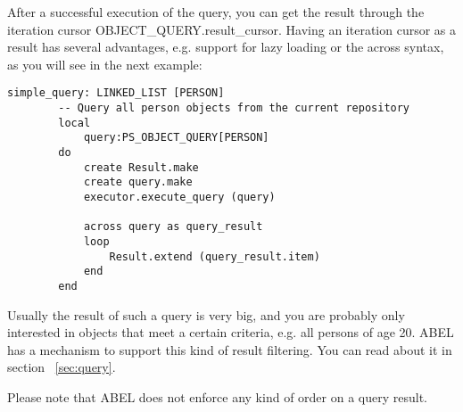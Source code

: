 After a successful execution of the query, you can get the result through the iteration cursor OBJECT\_QUERY.result\_cursor.
Having an iteration cursor as a result has several advantages, e.g. support for lazy loading or the across syntax, as you will see in the next example:

\begin{lstlisting}[language=OOSC2Eiffel, captionpos=b, caption={}, label={lst:simple_query}]
	simple_query: LINKED_LIST [PERSON]
		-- Query all person objects from the current repository
		local
			query:PS_OBJECT_QUERY[PERSON]
		do
			create Result.make
			create query.make
			executor.execute_query (query)

			across query as	query_result
			loop
				Result.extend (query_result.item)
			end
		end
\end{lstlisting}

Usually the result of such a query is very big, and you are probably only interested in objects that meet a certain criteria, e.g. all persons of age 20.
ABEL has a mechanism to support this kind of result filtering. You can read about it in section ~\ref{sec:query}.

Please note that ABEL does not enforce any kind of order on a query result.

\begin{comment}
ABEL can also filter the query results in advance so you only get a result set that meets certain criteria: 

\begin{lstlisting}[language=OOSC2Eiffel, captionpos=b, caption={}, label={lst:simple_filtered_query}]
	simple_filtered_query (name:STRING; age:INTEGER): detachable PERSON
		-- Query a person object from the current repository
		local
			query:PS_OBJECT_QUERY[PERSON]
			criterion:PS_PREDEFINED_CRITERION
		do
			create query.make
			create criterion.make ("last_name", "=", name)
			query.set_criterion (criterion)

			from
				executor.execute_query (query)
			until 
				query.result_cursor.after
			loop
				if query.result_cursor.item.age = age then 
					Result:= query.result_cursor.item
				end
			end
		end
\end{lstlisting}

This is just a very simple example for a query with a certain criterion.
ABEL has a powerful mechanism that also supports a logical combinations of multiple criteria, or using agents for filtering.
You can read more about criteria in section XY.

\end{comment}

